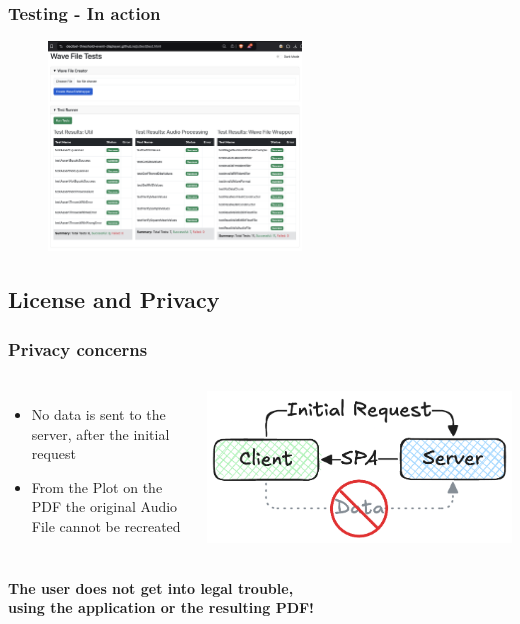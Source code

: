 \begin{frame}
    \frametitle{Testing - In action}
    \begin{figure}[H]
        \centering
        \includegraphics[width=0.6\textwidth]{../assets/js_test_framework_in_browser.png}
    \end{figure}
\end{frame}

\subsection{License and Privacy}\label{subsec:license-and-privacy}

\begin{frame}
    \frametitle{Privacy concerns}
    \begin{columns}
        \begin{itemize}
            \large
            \item No data is sent to the server, after the initial request
            \item From the Plot on the PDF the original Audio File cannot be recreated
        \end{itemize}
        \centering
        \includegraphics[width=1\linewidth]{../assets/privacy_illustrated.png}
    \end{columns}
    \hfill \break
    \hfill \break
    \textbf{
        The user does not get into legal trouble, \\
        using the application or the resulting PDF!
    }
\end{frame}

